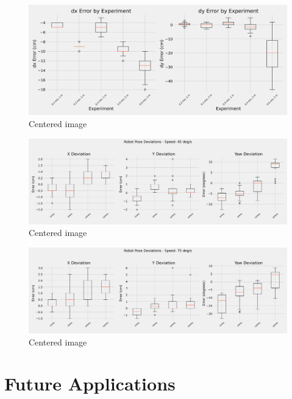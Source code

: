 \documentclass[a4paper, 12pt]{article}
\begin{document}
    \begin{figure}[H]
        \centering
        \includegraphics[width=0.99\linewidth]{images/experiment_results/linear_error_boxplots.png}
        \caption{Centered image}
    \end{figure}
    \begin{figure}[H]
        \centering
        \includegraphics[width=0.99\linewidth]{images/experiment_results/rotational_errors_speed_45.png}
        \caption{Centered image}
    \end{figure}
    \begin{figure}[H]
        \centering
        \includegraphics[width=0.99\linewidth]{images/experiment_results/rotational_errors_speed_75.png}
        \caption{Centered image}
    \end{figure}

    \pagebreak

    \section{Future Applications}
\end{document}

